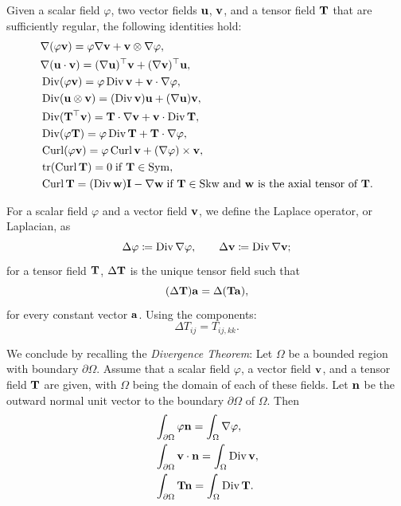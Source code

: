 Given a scalar field $\varphi$, two vector fields $\mathbf{u}$, $\mathbf{v}$, and a tensor field $\mathbf{T}$ that are sufficiently regular, the following identities hold:
\begin{equation}\label{identitadiff}
	\begin{aligned}
		&\nabla(\varphi\mathbf{v})=\varphi\nabla\mathbf{v}+\mathbf{v}\otimes\nabla\varphi,\\
		& \nabla(\mathbf{u}\cdot\mathbf{v})=(\nabla\mathbf{u})^\top\mathbf{v}+(\nabla\mathbf{v})^\top\mathbf{u},\\
		&\operatorname{Div}(\varphi\mathbf{v})=\varphi\operatorname{Div}\mathbf{v}+\mathbf{v}\cdot\nabla\varphi,\\
		&\operatorname{Div}(\mathbf{u}\otimes\mathbf{v})=(\operatorname{Div} \mathbf{v})\mathbf{u}+(\nabla\mathbf{u})\mathbf{v},\\
		&\operatorname{Div}(\mathbf{T}^{\top}\mathbf{v})=\mathbf{T}\cdot\nabla\mathbf{v}+\mathbf{v}\cdot\operatorname{Div}\mathbf{T},\\
		& \operatorname{Div}(\varphi\mathbf{T})=\varphi\operatorname{Div}\mathbf{T}+\mathbf{T}\cdot\nabla\varphi,\\
		&\operatorname{Curl}(\varphi\mathbf{v})=\varphi\operatorname{Curl}\mathbf{v}+(\nabla\varphi)\times\mathbf{v},\\
		& \operatorname{tr}(\operatorname{Curl} \mathbf{T})=0 \; {\rm if}\; \mathbf{T} \in \operatorname{Sym},\\
		&\operatorname{Curl} \mathbf{T} =(\operatorname{Div} \mathbf{w})\mathbf{I}-\nabla \mathbf{w} \; \textrm{if $\mathbf{T}\in \operatorname{Skw}$ and $\mathbf{w}$ is the axial tensor of $\mathbf{T}$}.
	\end{aligned}
\end{equation}

For a scalar field $\varphi$ and a vector field $\mathbf{v}$, we define the Laplace operator, or Laplacian, as
\begin{equation}
	\Delta\varphi\coloneqq \operatorname{Div} \nabla\varphi, \qquad \Delta \mathbf{v} \coloneqq \operatorname{Div} \nabla \mathbf{v};
\end{equation}
for a tensor field $\mathbf{T}$, $\Delta \mathbf{T}$ is the unique tensor field such that
\begin{equation}
	(\Delta \mathbf{T})\mathbf{a} =\Delta(\mathbf{T} \mathbf{a}),
\end{equation}
for every constant vector $\mathbf{a}$. Using the components:
\begin{equation}
	\Delta T_{ij}= T_{ij, kk}.
\end{equation}


We conclude by recalling the \textit{Divergence Theorem}:
Let $\Omega$ be a bounded region with boundary $\partial\Omega$. Assume that a scalar field $\varphi$, a vector field $\mathbf{v}$, and a tensor field $\mathbf{T}$ are given, with $\Omega$ being the domain of each of these fields. Let $\mathbf{n}$ be the outward normal unit vector to the boundary $\partial\Omega$ of $\Omega$. Then
\begin{equation}\label{theodiv}
	\begin{aligned}
		&\int_{\partial \Omega}\varphi\mathbf{n}=\int_\Omega\nabla\varphi, \\
		&\int_{\partial \Omega}\mathbf{v}\cdot\mathbf{n}  =\int_\Omega\operatorname{Div} \mathbf{v}, \\
		&	\int_{\partial\Omega}\mathbf{Tn} =\int_\Omega\operatorname{Div}\mathbf{T}. 
	\end{aligned}
\end{equation}

